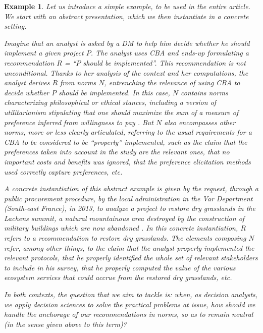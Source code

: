 \documentclass[preprint, french, english, 11pt, authoryear]{elsarticle}%
\newcommand{\ac}[1]{#1}
\newtheorem{example}{Example}
\begin{document}
\begin{example}
Let us introduce a simple example, to be used in the entire article. %
We start with an abstract presentation, which we then instantiate in a concrete setting.

Imagine that an analyst is asked by a \ac{DM} to help him decide whether he should implement a given project $P$.
The analyst uses \ac{CBA} \citep{layard_cost-benefit_1994} and ends-up formulating a recommendation $R$ = “$P$ should be implemented”.
This recommendation is not unconditional.
Thanks to her analysis of the context and her computations, the analyst derives $R$ from norms $N$, entrenching the relevance of using \ac{CBA} to decide whether $P$ should be implemented.
In this case, $N$ contains norms characterizing philosophical or ethical stances, including a version of utilitarianism stipulating that one should maximize the sum of a measure of preference inferred from willingness to pay \citep{meinard_ethical_2016}. 
But $N$ also encompasses other norms, more or less clearly articulated, referring to the usual requirements for a \ac{CBA} to be considered to be ``properly'' implemented, such as the claim that the preferences taken into account in the study are the relevant ones,
that no important costs and benefits was ignored, that the preference elicitation methods used correctly capture preferences, etc.

A concrete instantiation of this abstract example is given by the request, through a public procurement procedure, by the local administration in the Var Department (South-east France), in 2013, to analyze a project to restore dry grasslands in the Lachens summit, 
a natural mountainous area destroyed by the construction of military buildings which are now abandoned \citep{meinard_etude_2015}.
In this concrete instantiation, $R$ refers to a recommendation to restore dry grasslands. 
The elements composing $N$ refer, among other things, to the claim that the analyst properly implemented the relevant protocols, 
that he properly identified the whole set of relevant stakeholders to include in his survey, that he properly computed the value of the various ecosystem services that could accrue from the restored dry grasslands, etc.

In both contexts, the question that we aim to tackle is: when, as decision analysts, we apply decision sciences to solve the practical problems at issue, how should we handle the anchorage of our recommendations in norms, so as to remain neutral (in the sense given above to this term)?
\end{example}
\end{document}
